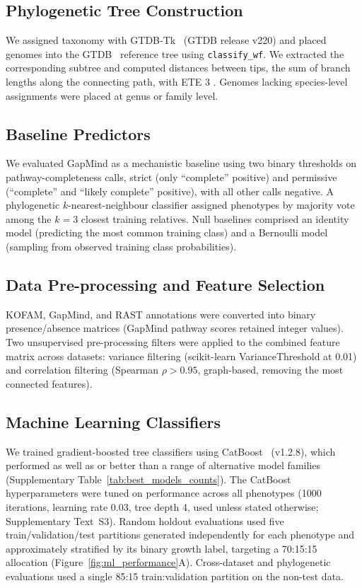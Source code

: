 \subsection*{Phylogenetic Tree Construction}

We assigned taxonomy with GTDB-Tk~\cite{Chaumeil2022GTDBTk} (GTDB release v220) and placed genomes into the GTDB~\cite{Parks2018GTDB} reference tree using \texttt{classify\_wf}.
We extracted the corresponding subtree and computed distances between tips, the sum of branch lengths along the connecting path, with ETE 3 \cite{HuertaCepas2016ETE3}.
Genomes lacking species-level assignments were placed at genus or family level.

\subsection*{Baseline Predictors}

We evaluated GapMind as a mechanistic baseline using two binary thresholds on pathway-completeness calls, strict (only ``complete'' positive) and permissive (``complete'' and ``likely complete'' positive), with all other calls negative.
A phylogenetic $k$-nearest-neighbour classifier assigned phenotypes by majority vote among the $k=3$ closest training relatives.
Null baselines comprised an identity model (predicting the most common training class) and a Bernoulli model (sampling from observed training class probabilities).

\subsection*{Data Pre-processing and Feature Selection}

KOFAM, GapMind, and RAST annotations were converted into binary presence/absence matrices (GapMind pathway scores retained integer values).
Two unsupervised pre-processing filters were applied to the combined feature matrix across datasets: variance filtering (scikit-learn \cite{Pedregosa2011Sklearn} VarianceThreshold at 0.01) and correlation filtering (Spearman $\rho > 0.95$, graph-based, removing the most connected features).

\subsection*{Machine Learning Classifiers}

We trained gradient-boosted tree classifiers using CatBoost~\cite{Prokhorenkova2018CatBoost} (v1.2.8), which performed as well as or better than a range of alternative model families (Supplementary Table~\ref{tab:best_models_counts}).
The CatBoost hyperparameters were tuned on performance across all phenotypes (1000 iterations, learning rate 0.03, tree depth 4, used unless stated otherwise; Supplementary Text~S3).
Random holdout evaluations used five train/validation/test partitions generated independently for each phenotype and approximately stratified by its binary growth label, targeting a 70:15:15 allocation (Figure~\ref{fig:ml_performance}A).
Cross-dataset and phylogenetic evaluations used a single 85:15 train:validation partition on the non-test data.

